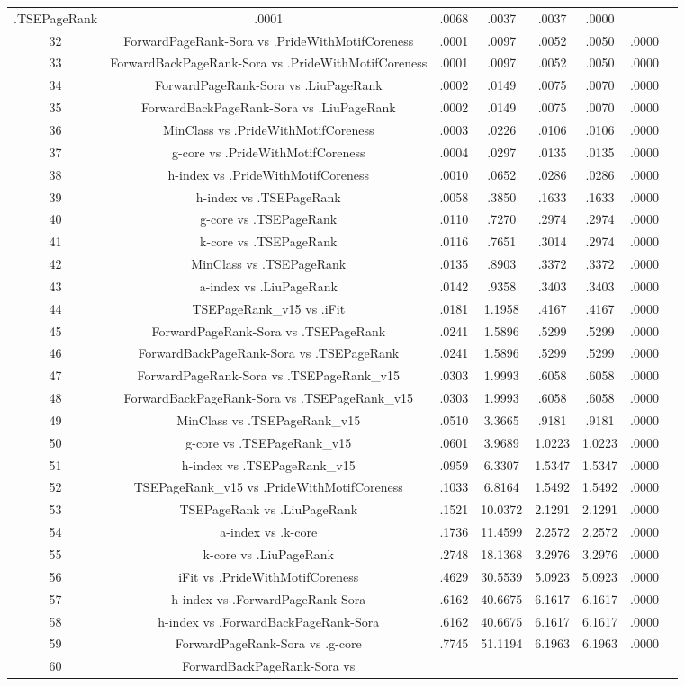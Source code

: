 \documentclass[a4paper,10pt]{article}
\begin{document}
\begin{landscape}
\begin{table}[!htp]
\begin{tabular}{cccccccc}
.TSEPageRank&.0001&.0068&.0037&.0037&.0000\\32&ForwardPageRank-Sora vs .PrideWithMotifCoreness&.0001&.0097&.0052&.0050&.0000\\33&ForwardBackPageRank-Sora vs .PrideWithMotifCoreness&.0001&.0097&.0052&.0050&.0000\\34&ForwardPageRank-Sora vs .LiuPageRank&.0002&.0149&.0075&.0070&.0000\\35&ForwardBackPageRank-Sora vs .LiuPageRank&.0002&.0149&.0075&.0070&.0000\\36&MinClass vs .PrideWithMotifCoreness&.0003&.0226&.0106&.0106&.0000\\37&g-core vs .PrideWithMotifCoreness&.0004&.0297&.0135&.0135&.0000\\38&h-index vs .PrideWithMotifCoreness&.0010&.0652&.0286&.0286&.0000\\39&h-index vs .TSEPageRank&.0058&.3850&.1633&.1633&.0000\\40&g-core vs .TSEPageRank&.0110&.7270&.2974&.2974&.0000\\41&k-core vs .TSEPageRank&.0116&.7651&.3014&.2974&.0000\\42&MinClass vs .TSEPageRank&.0135&.8903&.3372&.3372&.0000\\43&a-index vs .LiuPageRank&.0142&.9358&.3403&.3403&.0000\\44&TSEPageRank_v15 vs .iFit&.0181&1.1958&.4167&.4167&.0000\\45&ForwardPageRank-Sora vs .TSEPageRank&.0241&1.5896&.5299&.5299&.0000\\46&ForwardBackPageRank-Sora vs .TSEPageRank&.0241&1.5896&.5299&.5299&.0000\\47&ForwardPageRank-Sora vs .TSEPageRank_v15&.0303&1.9993&.6058&.6058&.0000\\48&ForwardBackPageRank-Sora vs .TSEPageRank_v15&.0303&1.9993&.6058&.6058&.0000\\49&MinClass vs .TSEPageRank_v15&.0510&3.3665&.9181&.9181&.0000\\50&g-core vs .TSEPageRank_v15&.0601&3.9689&1.0223&1.0223&.0000\\51&h-index vs .TSEPageRank_v15&.0959&6.3307&1.5347&1.5347&.0000\\52&TSEPageRank_v15 vs .PrideWithMotifCoreness&.1033&6.8164&1.5492&1.5492&.0000\\53&TSEPageRank vs .LiuPageRank&.1521&10.0372&2.1291&2.1291&.0000\\54&a-index vs .k-core&.1736&11.4599&2.2572&2.2572&.0000\\55&k-core vs .LiuPageRank&.2748&18.1368&3.2976&3.2976&.0000\\56&iFit vs .PrideWithMotifCoreness&.4629&30.5539&5.0923&5.0923&.0000\\57&h-index vs .ForwardPageRank-Sora&.6162&40.6675&6.1617&6.1617&.0000\\58&h-index vs .ForwardBackPageRank-Sora&.6162&40.6675&6.1617&6.1617&.0000\\59&ForwardPageRank-Sora vs .g-core&.7745&51.1194&6.1963&6.1963&.0000\\60&ForwardBackPageRank-Sora vs 
\end{tabular}
\end{table}
\end{landscape}
\end{document}
